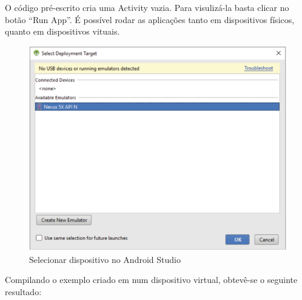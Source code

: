 O código pré-escrito cria uma Activity vazia. Para visulizá-la basta clicar no 
botão \enquote{Run App}. É possível rodar as aplicações tanto em dispositivos 
físicos, quanto em dispositivos vituais.

\begin{figure}[H]
    \centering
    \includegraphics[scale=0.8]{images/android_studio_avd}
    \caption[Selecionar dispositivo no Android Studio]
    {Selecionar dispositivo no Android Studio \cite{DiMarzio2016}}
    \label{fig:android_studio_avd}
\end{figure}

Compilando o exemplo criado em \cite{DiMarzio2016} num dispositivo virtual,
 obtevê-se o seguinte resultado:

